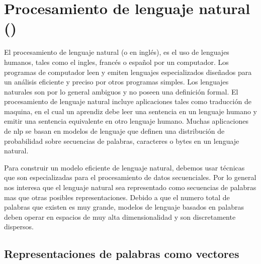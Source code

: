 
\section{Procesamiento de lenguaje natural ()}

El procesamiento de lenguaje natural (o  en inglés), es el uso de lenguajes humanos, tales como el ingles, francés o español por un computador. Los programas de computador leen y emiten lenguajes especializados diseñados para un análisis eficiente y preciso por otros programas simples. Los lenguajes naturales son por lo general ambiguos y no poseen una definición formal. El procesamiento de lenguaje natural incluye aplicaciones tales como traducción de maquina, en el cual un aprendiz debe leer una sentencia en un lenguaje humano y emitir una sentencia equivalente en otro lenguaje humano. Muchas aplicaciones de \gls{nlp} se basan en modelos de lenguaje que definen una distribución de probabilidad sobre secuencias de palabras, caracteres o bytes en un lenguaje natural.

Para construir un modelo eficiente de lenguaje natural, debemos usar técnicas que son especializadas para el procesamiento de datos secuenciales. Por lo general nos interesa que el lenguaje natural sea representado como secuencias de palabras mas que otras posibles representaciones. Debido a que el numero total de palabras que existen es muy grande, modelos de lenguaje basados en palabras deben operar en espacios de muy alta dimensionalidad y son discretamente dispersos.


\subsection{Representaciones de palabras como vectores} \label{ch:word-representations}

\subsubsection{}

